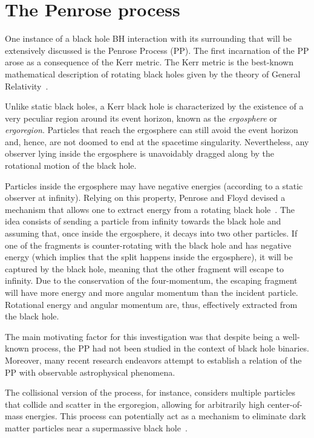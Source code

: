 \section{The Penrose process}

One instance of a black hole BH interaction with its surrounding that will be extensively discussed is the Penrose Process (PP). The first incarnation of the PP arose as a consequence of the Kerr metric. The Kerr metric is the best-known mathematical description of rotating black holes given by the theory of General Relativity~\cite{Visser:2007fj,Bambi:2011mj,Teukolsky:2014vca,berti}.

Unlike static black holes, a Kerr black hole is characterized by the existence of a very peculiar region around its event horizon, known as the \emph{ergosphere} or \emph{ergoregion}. Particles that reach the ergosphere can still avoid the event horizon and, hence, are not doomed to end at the spacetime singularity. Nevertheless, any observer lying inside the ergosphere is unavoidably dragged along by the rotational motion of the black hole.

Particles inside the ergosphere may have negative energies (according to a static observer at infinity). Relying on this property, Penrose and Floyd devised a mechanism that allows one to extract energy from a rotating black hole~\cite{PENROSE1971}. The idea consists of sending a particle from infinity towards the black hole and assuming that, once inside the ergosphere, it decays into two other particles. If one of the fragments is counter-rotating with the black hole and has negative energy (which implies that the split happens inside the ergosphere), it will be captured by the black hole, meaning that the other fragment will escape to infinity. Due to the conservation of the four-momentum, the escaping fragment will have more energy and more angular momentum than the incident particle. Rotational energy and angular momentum are, thus, effectively extracted from the black hole.

The main motivating factor for this investigation was that despite being a well-known process, the PP had not been studied in the context of black hole binaries. Moreover, many recent research endeavors attempt to establish a relation of the PP with observable astrophysical phenomena.

The collisional version of the process, for instance, considers multiple particles that collide and scatter in the ergoregion, allowing for arbitrarily high center-of-mass energies. This process can potentially act as a mechanism to eliminate dark matter particles near a supermassive black hole~\cite{Schnittman:2018ccg}.

